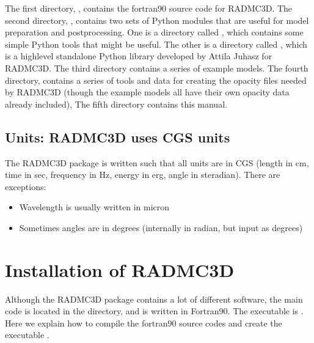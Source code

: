 \documentclass[letterpaper,10pt,english]{sphinxmanual}
\begin{document}
The first directory, , contains the fortran\sphinxhyphen{}90 source code for
RADMC\sphinxhyphen{}3D. The second directory, , contains two sets of Python modules
that are useful for model preparation and post\sphinxhyphen{}processing. One is a directory
called , which contains some simple Python tools that might be
useful. The other is a directory called , which is a high\sphinxhyphen{}level
stand\sphinxhyphen{}alone Python library developed by Attila Juhasz for RADMC\sphinxhyphen{}3D. The third
directory contains a series of example models. The fourth directory,
 contains a series of tools and data for creating the opacity
files needed by RADMC\sphinxhyphen{}3D (though the example models all have their own
opacity data already included), The fifth directory contains
this manual.


\section{Units: RADMC\sphinxhyphen{}3D uses CGS units}
\label{\detokenize{overview:units-radmc-3d-uses-cgs-units}}
The RADMC\sphinxhyphen{}3D package is written such that all units are in CGS (length in
cm, time in sec, frequency in Hz, energy in erg, angle in steradian). There
are exceptions:
\begin{itemize}
\item {} 
Wavelength is usually written in micron

\item {} 
Sometimes angles are in degrees (internally in radian, but input as degrees)

\end{itemize}


\chapter{Installation of RADMC\sphinxhyphen{}3D}
\label{\detokenize{installation:installation-of-radmc-3d}}\label{\detokenize{installation:chap-compilation}}\label{\detokenize{installation::doc}}
Although the RADMC\sphinxhyphen{}3D package contains a lot of different software,
the main code is located in the  directory, and is
written in Fortran\sphinxhyphen{}90. The executable is . Here
we explain how to compile the fortran\sphinxhyphen{}90 source codes and create
the executable .
\end{document}
